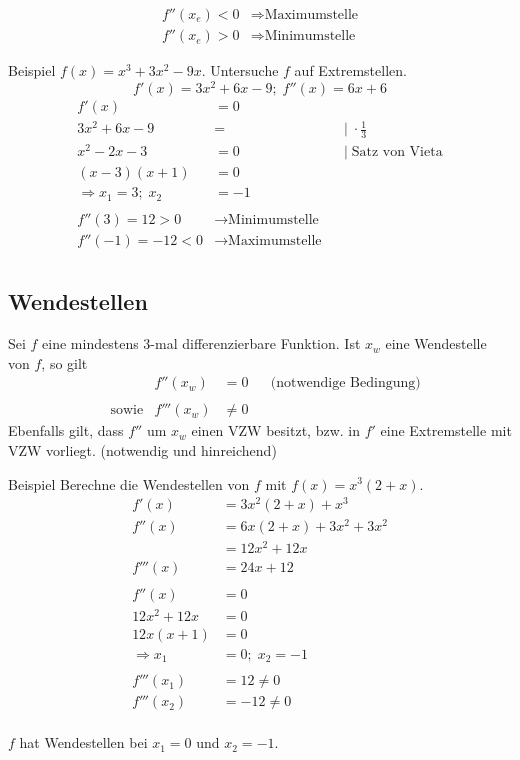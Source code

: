 \documentclass{article}
\begin{document}
\begin{align*}
    f''\left(x_e\right)<0 &\Rightarrow \text{Maximumstelle} \\
    f''\left(x_e\right)>0 &\Rightarrow \text{Minimumstelle}
\end{align*}

\newpage
\begin{boxx}[DarkBlue]{Beispiel}
    $\displaystyle f(x) = x^3 + 3x^2 - 9x$. Untersuche $f$ auf Extremstellen.
    \[f'(x) = 3x^2+6x-9;\; f''(x)=6x+6\]
    \begin{align*}
        f'(x) &= 0 \\
        3x^2 + 6x - 9 &= & &|\; \cdot \frac{1}{3} \\
        x^2 -2x -3 &= 0 & &|\; \text{Satz von Vieta} \\
        (x-3)(x+1) &= 0 \\
        \Rightarrow x_1= 3;\; x_2 &= -1 \\\\
        f''(3) = 12 > 0 &\rightarrow \text{Minimumstelle} \\
        f''(-1) = -12 < 0 &\rightarrow \text{Maximumstelle} \\
    \end{align*}
\end{boxx}

\subsection{Wendestellen}
Sei $f$ eine mindestens 3-mal differenzierbare Funktion. 
Ist $x_w$ eine Wendestelle von $f$, so gilt
\begin{align*}
    &&&& f''\left(x_w\right) &= 0 & &\text{(notwendige Bedingung)} &&\\\\
    &&&\text{sowie} & f'''\left(x_w\right) &\not = 0
\end{align*}
Ebenfalls gilt, dass $f''$ um $x_w$ einen VZW besitzt, 
bzw. in $f'$ eine Extremstelle mit VZW vorliegt. (notwendig und hinreichend)
\begin{boxx}[DarkBlue]{Beispiel}
    Berechne die Wendestellen von $f$ mit $\displaystyle f(x) = x^3\left(2 + x\right)$.
    \begin{align*}
        f'(x) &= 3x^2(2+x) + x^3 \\
        f''(x) &= 6x(2+x)+3x^2 + 3x^2 \\
        &= 12x^2 + 12x \\
        f'''(x) &= 24x + 12\\\\
        f''(x) &= 0 \\
        12x^2 + 12x &= 0 \\
        12x(x+1)&= 0 \\
        \Rightarrow x_1 &= 0;\; x_2 = -1 \\\\
        f'''\left(x_1\right) &= 12 \not = 0 \\
        f'''\left(x_2\right) &= -12 \not = 0 \\
    \end{align*}

    $f$ hat Wendestellen bei $x_1 = 0$ und $x_2 = -1$.
\end{boxx}
\end{document}
